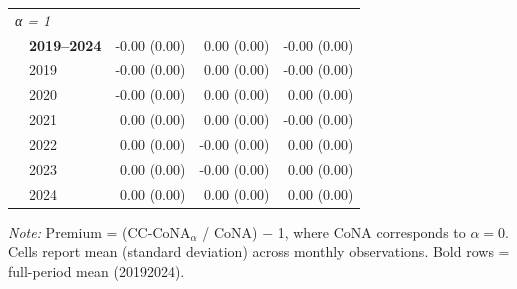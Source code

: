 \begin{table}[htbp]
\begin{tabular}{llrrr}
\midrule
\multicolumn{5}{l}{\textit{α = 1}} \\
 & \textbf{2019–2024} & -0.00 (0.00) & 0.00 (0.00) & -0.00 (0.00) \\
 & 2019 & -0.00 (0.00) & 0.00 (0.00) & -0.00 (0.00) \\
 & 2020 & -0.00 (0.00) & 0.00 (0.00) & 0.00 (0.00) \\
 & 2021 & 0.00 (0.00) & 0.00 (0.00) & -0.00 (0.00) \\
 & 2022 & 0.00 (0.00) & -0.00 (0.00) & 0.00 (0.00) \\
 & 2023 & 0.00 (0.00) & -0.00 (0.00) & 0.00 (0.00) \\
 & 2024 & 0.00 (0.00) & 0.00 (0.00) & 0.00 (0.00) \\
\bottomrule
\end{tabular}
\begin{minipage}{\linewidth}
\vspace{2pt}\footnotesize
\textit{Note:} Premium = (CC-CoNA$_\alpha$ / CoNA) $-$ 1, where CoNA corresponds to $\alpha = 0$. Cells report mean (standard deviation) across monthly observations. Bold rows = full-period mean (2019\textendash{}2024).
\end{minipage}
\end{table}
